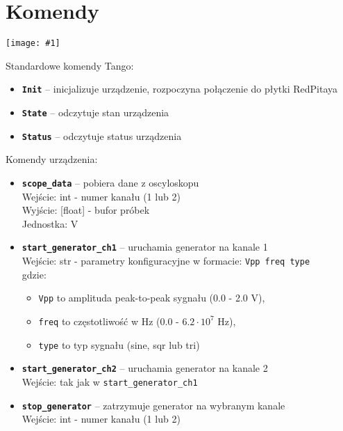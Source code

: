\documentclass[12pt,a4paper]{article}
\newcommand{\screenshot}[1]{\begin{minipage}[c]{\textwidth}\texttt{[image: \#1]}\end{minipage}}
\begin{document}
	\section{Komendy}
	\screenshot{screenshots/commands.png}
	Standardowe komendy Tango:
	\begin{itemize}
		\item \textbf{\texttt{Init}} -- inicjalizuje urządzenie, rozpoczyna połączenie do płytki RedPitaya
		\item \textbf{\texttt{State}} -- odczytuje stan urządzenia
		\item \textbf{\texttt{Status}} -- odczytuje status urządzenia
	\end{itemize}
	Komendy urządzenia:
	\begin{itemize}
		\item \textbf{\texttt{scope\_data}} -- pobiera dane z oscyloskopu\\
			  Wejście: int - numer kanału (1 lub 2)\\
			  Wyjście: [float] - bufor próbek\\
			  Jednostka: V\\
		\item \textbf{\texttt{start\_generator\_ch1}} -- uruchamia generator na kanale 1\\
			  Wejście: str - parametry konfiguracyjne w formacie: \texttt{Vpp freq type}\\
			  gdzie:
			  \begin{itemize}
			  	\item \texttt{Vpp} to amplituda peak-to-peak sygnału (0.0 - 2.0 V),
			  	\item \texttt{freq} to częstotliwość w Hz (0.0 - $6.2\cdot10^7$ Hz),
			  	\item \texttt{type} to typ sygnału (sine, sqr lub tri)
			  \end{itemize}
		\item \textbf{\texttt{start\_generator\_ch2}} -- uruchamia generator na kanale 2\\
			  Wejście: tak jak w \texttt{start\_generator\_ch1}
		\item \textbf{\texttt{stop\_generator}} -- zatrzymuje generator na wybranym kanale\\
			  Wejście: int - numer kanału (1 lub 2)
	\end{itemize}
\end{document}
